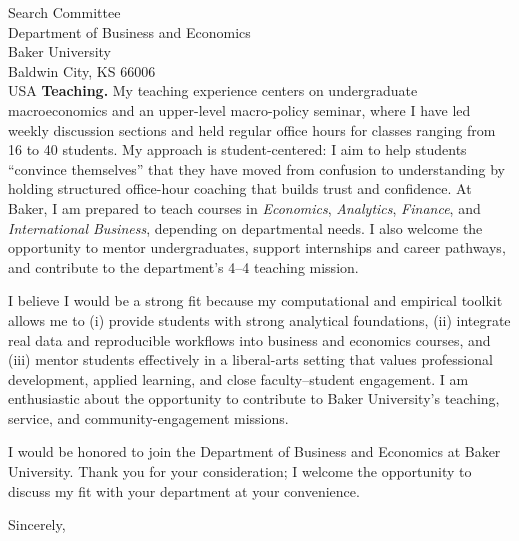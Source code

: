 \documentclass[11pt,letterpaper]{letter}
\begin{document}
\begin{letter}{Search Committee \\
Department of Business and Economics \\
Baker University \\
Baldwin City, KS 66006 \\ USA}
\textbf{Teaching.} My teaching experience centers on undergraduate macroeconomics and an upper-level macro-policy seminar, where I have led weekly discussion sections and held regular office hours for classes ranging from 16 to 40 students. My approach is student-centered: I aim to help students “convince themselves” that they have moved from confusion to understanding by holding structured office-hour coaching that builds trust and confidence. At Baker, I am prepared to teach courses in \textit{Economics}, \textit{Analytics}, \textit{Finance}, and \textit{International Business}, depending on departmental needs. I also welcome the opportunity to mentor undergraduates, support internships and career pathways, and contribute to the department’s 4–4 teaching mission.

I believe I would be a strong fit because my computational and empirical toolkit allows me to (i) provide students with strong analytical foundations, (ii) integrate real data and reproducible workflows into business and economics courses, and (iii) mentor students effectively in a liberal-arts setting that values professional development, applied learning, and close faculty–student engagement. I am enthusiastic about the opportunity to contribute to Baker University’s teaching, service, and community-engagement missions.

I would be honored to join the Department of Business and Economics at Baker University. Thank you for your consideration; I welcome the opportunity to discuss my fit with your department at your convenience.

\closing{Sincerely,}

\end{letter}
\end{document}
